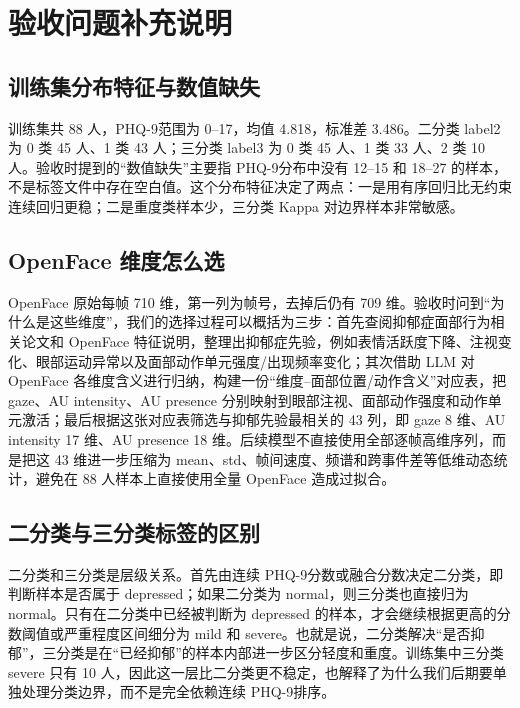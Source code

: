 \documentclass[UTF8,zihao=-4,fontset=windows]{ctexart}
\newcommand{\phq}{PHQ-9}
\begin{document}
\section{验收问题补充说明}

\subsection{训练集分布特征与数值缺失}

训练集共 88 人，\phq 范围为 0--17，均值 4.818，标准差 3.486。二分类 label2 为 0 类 45 人、1 类 43 人；三分类 label3 为 0 类 45 人、1 类 33 人、2 类 10 人。验收时提到的“数值缺失”主要指 \phq 分布中没有 12--15 和 18--27 的样本，不是标签文件中存在空白值。这个分布特征决定了两点：一是用有序回归比无约束连续回归更稳；二是重度类样本少，三分类 Kappa 对边界样本非常敏感。

\subsection{OpenFace 维度怎么选}

OpenFace 原始每帧 710 维，第一列为帧号，去掉后仍有 709 维。验收时问到“为什么是这些维度”，我们的选择过程可以概括为三步：首先查阅抑郁症面部行为相关论文和 OpenFace 特征说明，整理出抑郁症先验，例如表情活跃度下降、注视变化、眼部运动异常以及面部动作单元强度/出现频率变化；其次借助 LLM 对 OpenFace 各维度含义进行归纳，构建一份“维度--面部位置/动作含义”对应表，把 gaze、AU intensity、AU presence 分别映射到眼部注视、面部动作强度和动作单元激活；最后根据这张对应表筛选与抑郁先验最相关的 43 列，即 gaze 8 维、AU intensity 17 维、AU presence 18 维。后续模型不直接使用全部逐帧高维序列，而是把这 43 维进一步压缩为 mean、std、帧间速度、频谱和跨事件差等低维动态统计，避免在 88 人样本上直接使用全量 OpenFace 造成过拟合。

\subsection{二分类与三分类标签的区别}

二分类和三分类是层级关系。首先由连续 \phq 分数或融合分数决定二分类，即判断样本是否属于 depressed；如果二分类为 normal，则三分类也直接归为 normal。只有在二分类中已经被判断为 depressed 的样本，才会继续根据更高的分数阈值或严重程度区间细分为 mild 和 severe。也就是说，二分类解决“是否抑郁”，三分类是在“已经抑郁”的样本内部进一步区分轻度和重度。训练集中三分类 severe 只有 10 人，因此这一层比二分类更不稳定，也解释了为什么我们后期要单独处理分类边界，而不是完全依赖连续 \phq 排序。
\end{document}
